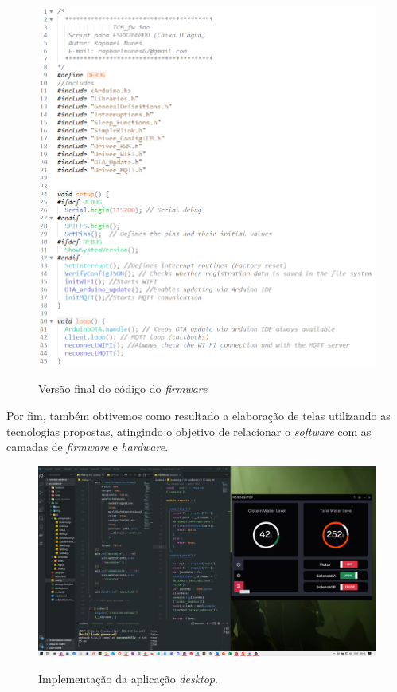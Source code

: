   
\begin{figure}[H]
	\centering
	\caption{Versão final do código do \textit{firmware}}
	\includegraphics[width=1\textwidth]{figuras/tcm_main.png}
	\label{fig:tcm_main}
\end{figure}


Por fim, também obtivemos como resultado a elaboração de telas utilizando as tecnologias propostas, atingindo o objetivo de relacionar o \textit{software} com as camadas de \textit{firmware} e \textit{hardware}. 

\begin{figure}[H]
	\centering
	\caption{Implementação da aplicação \textit{desktop}.}
	\includegraphics[width=1\textwidth]{figuras/rcs_desktop.png}
	\label{fig:tela_desktop}
\end{figure}



